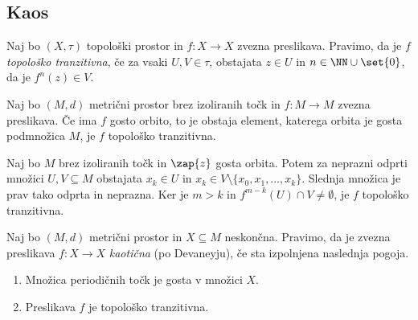 \subsection{Kaos}

\begin{definicija}
    Naj bo \((X, \tau)\) topološki prostor in \(f \colon X \to X\) zvezna preslikava. Pravimo, da je \(f\) \emph{topološko tranzitivna}, če za vsaki \(U, V \in \tau\), obstajata \(z \in U\) in \(n \in \NN \cup \set{0}\), da je \(f^n (z) \in V\).
\end{definicija}

\begin{trditev}
    Naj bo \((M, d)\) metrični prostor brez izoliranih točk in \(f \colon M \to M\) zvezna preslikava. Če ima \(f\) gosto orbito, to je obstaja element, katerega orbita je gosta podmnožica \(M\), je \(f\) topološko tranzitivna.
\end{trditev}

\begin{dokaz}
    Naj bo \(M\) brez izoliranih točk in \(\zap{z}\) gosta orbita. Potem za neprazni odprti množici \(U, V \subseteq M\) obstajata \(x_k \in U\) in \(x_k \in V \setminus \{x_0, x_1, \dots, x_k\}\). Slednja množica je prav tako odprta in neprazna. Ker je \(m > k\) in \(f^{m - k} (U) \cap V \neq \emptyset\), je \(f\) topološko tranzitivna.

\end{dokaz}

\begin{definicija}
    Naj bo \((M, d)\) metrični prostor in \(X \subseteq M\) neskončna. Pravimo, da je zvezna preslikava \(f \colon X \to X\) \emph{kaotična} (po Devaneyju), če sta izpolnjena naslednja pogoja.
    \begin{enumerate}
        \item Množica periodičnih točk je gosta v množici \(X\).
        \item Preslikava \(f\) je topološko tranzitivna.
    \end{enumerate}
\end{definicija}

